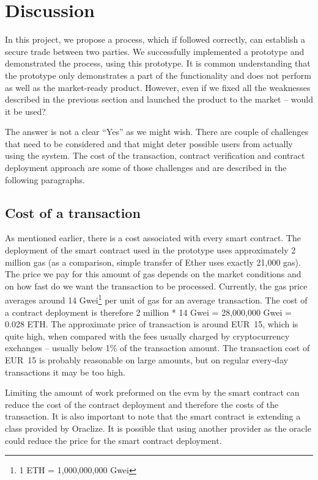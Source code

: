 \section{Discussion}\label{sec:discussion}

In this project, we propose a process, which if followed correctly, can establish a secure trade between two parties. We successfully implemented a prototype and demonstrated the process, using this prototype. It is common understanding that the prototype only demonstrates a part of the functionality and does not perform as well as the market-ready product. However, even if we fixed all the weaknesses described in the previous section and launched the product to the market -- would it be used?

The answer is not a clear ``Yes'' as we might wish. There are couple of challenges that need to be considered and that might deter possible users from actually using the system. The cost of the transaction, contract verification and contract deployment approach are some of those challenges and are described in the following paragraphs.

\subsection{Cost of a transaction}
As mentioned earlier, there is a cost associated with every smart contract. The deployment of the smart contract used in the prototype uses approximately 2 million gas (as a comparison, simple transfer of Ether uses exactly 21,000 gas). The price we pay for this amount of gas depends on the market conditions and on how fast do we want the transaction to be processed. Currently, the gas price averages around 14 Gwei\footnote{1 ETH = 1,000,000,000 Gwei} per unit of gas for an average transaction\footnotemark. The cost of a contract deployment is therefore 2 million * 14 Gwei = 28,000,000 Gwei = 0.028 ETH. The approximate price of transaction is around EUR~15, which is quite high, when compared with the fees usually charged by cryptocurrency exchanges -- usually below 1\% of the transaction amount. The transaction cost of EUR~15 is probably reasonable on large amounts, but on regular every-day transactions it may be too high.
% 

Limiting the amount of work preformed on the \acrshort{evm} by the smart contract can reduce the cost of the contract deployment and therefore the costs of the transaction. It is also important to note that the smart contract is extending a class provided by Oraclize. It is possible that using another provider as the oracle could reduce the price for the smart contract deployment.

